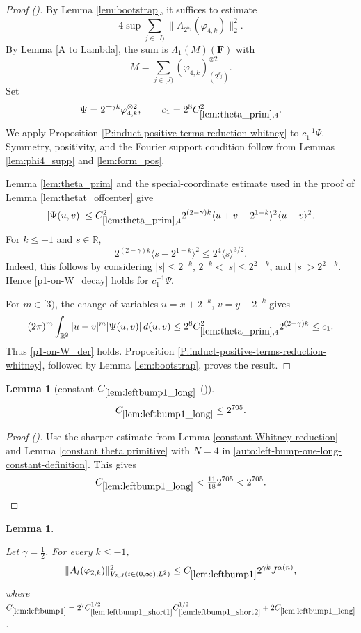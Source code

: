 \documentclass[12pt,reqno]{amsart}
\newcommand{\auto}{{({\tiny\faCar})}}
\theoremstyle{plain}
\newtheorem{lemma}[theorem]{Lemma}
\numberwithin{equation}{section}
\theoremstyle{remark}
\newcommand{\using}[1]{}
\newcommand{\R}{{\mathbb R}}
\newcommand{\F}{\mathbf{F}}
\begin{document}
\begin{proof}[Proof \auto]
By Lemma \ref{lem:bootstrap}, it suffices to estimate
\[
4\sup\sum_{j\in[J)}\|A_{2^{k_j}}(\varphi_{4,k})\|_2^2.
\]
By Lemma \ref{A to Lambda}, the sum is $\Lambda_1(M)(\F)$ with
\[
M=\sum_{j\in[J)}(\varphi_{4,k})_{(2^{k_j})}^{\otimes2}.
\]
Set
\[
\Psi=2^{-\gamma k}\varphi_{4,k}^{\otimes2},
\qquad
c_1=2^8C_{\ref{lem:theta_prim},4}^2.
\]
We apply Proposition \ref{P:induct-positive-terms-reduction-whitney} to $c_1^{-1}\Psi$. Symmetry, positivity, and the Fourier support condition follow from Lemmas \ref{lem:phi4_supp} and \ref{lem:form_pos}.

Lemma \ref{lem:theta_prim} and the special-coordinate estimate used in the proof of Lemma \ref{lem:thetat_offcenter} give
\[
|\Psi(u,v)|
\le C_{\ref{lem:theta_prim},4}^2
2^{(2-\gamma)k}
\langle u+v-2^{1-k}\rangle^2
\langle u-v\rangle^2.
\]
For $k\le-1$ and $s\in\R$,
\[
2^{(2-\gamma)k}\langle s-2^{1-k}\rangle^2
\le2^4\langle s\rangle^{3/2}.
\]
Indeed, this follows by considering $|s|\le2^{-k}$, $2^{-k}<|s|\le2^{2-k}$, and $|s|>2^{2-k}$. Hence \eqref{p1-on-W_decay} holds for $c_1^{-1}\Psi$.

For $m\in[3)$, the change of variables $u=x+2^{-k}$, $v=y+2^{-k}$ gives
\[
(2\pi)^m\int_{\R^2}|u-v|^m|\Psi(u,v)|\,d(u,v)
\le2^8C_{\ref{lem:theta_prim},4}^2 2^{(2-\gamma)k}
\le c_1.
\]
Thus \eqref{p1-on-W_der} holds. Proposition \ref{P:induct-positive-terms-reduction-whitney}, followed by Lemma \ref{lem:bootstrap}, proves the result.
\end{proof}

\begin{lemma}[constant $C_{\ref{lem:leftbump1_long}}$ \auto]\label{constant left bump one long}\using{constant Whitney reduction}\using{constant theta primitive}\using{lem:leftbump1_long}
\begin{equation}\label{constant left bump one long bound}
C_{\ref{lem:leftbump1_long}}\le2^{705}.
\end{equation}
\end{lemma}
\begin{proof}[Proof \auto]
Use the sharper estimate from Lemma \ref{constant Whitney reduction} and Lemma \ref{constant theta primitive} with $N=4$ in \eqref{auto:left-bump-one-long-constant-definition}. This gives
\[
C_{\ref{lem:leftbump1_long}}<\tfrac{11}{18}2^{705}<2^{705}.
\]
\end{proof}


\begin{lemma}\label{lem:leftbump1}\using{lem:rescaling}\using{lem:shortlongjumps}\using{lem:leftbump1_long}\using{lem:leftbump1_short1}\using{lem:leftbump1_short2}\using{lem:ftccs-R}\using{lem:ftc_ATphi}

Let $\gamma=\frac12$. For every $k\le -1$,
\begin{equation}\label{leftbump1}
\|A_{t}(\varphi_{2,k})\|_{V_{2,J}(t\in(0,\infty);L^2)}^2  \le C_{\ref{lem:leftbump1}} 2^{\gamma k} J^{\alpha(n)}, \end{equation}
where  $C_{\ref{lem:leftbump1}}
=2^7C_{\ref{lem:leftbump1_short1}}^{1/2}C_{\ref{lem:leftbump1_short2}}^{1/2}
+2C_{\ref{lem:leftbump1_long}}$.
\end{lemma}
\end{document}
